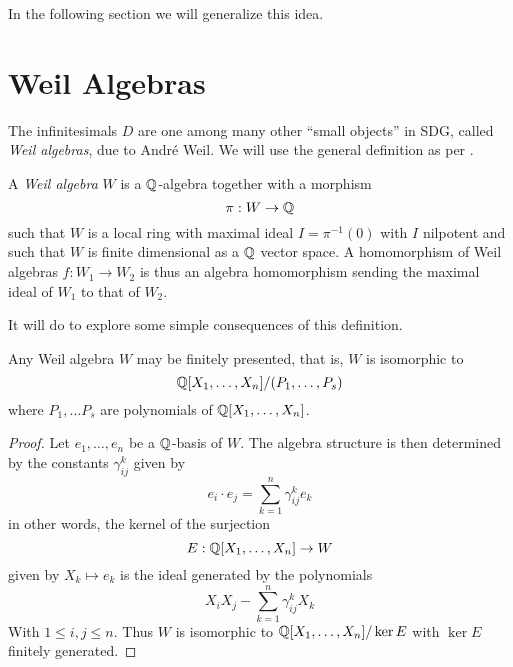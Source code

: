 In the following section we will generalize this idea.

\section{Weil Algebras}

The infinitesimals \( D \) are one among many other ``small objects'' in SDG, called \emph{Weil algebras}, due to André Weil. We will use the general definition as per \cite{bun17}.

\begin{defn}
  A \emph{Weil algebra} \( W \) is a \( \mathbb{Q} \)-algebra together with a morphism
  \begin{equation*}
    \pi: W\to\mathbb{Q}
  \end{equation*}
  such that \( W \) is a local ring with maximal ideal \( I=\pi^{-1}(0) \) with \( I \) nilpotent and such that \( W \) is finite dimensional as a \( \mathbb{Q} \) vector space. A homomorphism of Weil algebras \( f:W_1\to W_2 \) is thus an algebra homomorphism sending the maximal ideal of \( W_1 \) to that of \( W_2 \).
\end{defn}



It will do to explore some simple consequences of this definition.

\begin{lemma}
  Any Weil algebra \( W \) may be finitely presented, that is, \( W \) is isomorphic to
  \begin{equation*}
    \mathbb{Q}[X_1,\dots,X_n]/(P_1,\dots,P_s)
  \end{equation*}
  where \( P_1,\dots P_s \) are polynomials of \( \mathbb{Q}[X_1,\dots,X_n] \).
  \label{lm:finpr}
\end{lemma}

\begin{proof}
  Let \( e_1,\dots,e_n \) be a \( \mathbb{Q} \)-basis of \( W \). The algebra structure is then determined by the constants \( \gamma_{ij}^k \) given by
  \begin{equation*}
    e_i\cdot e_j = \sum_{k=1}^n \gamma_{ij}^ke_k
  \end{equation*}
  in other words, the kernel of the surjection
  \begin{equation*}
    E: \mathbb{Q}[X_1,\dots,X_n]\to W
  \end{equation*}
  given by \( X_k\mapsto e_k \) is the ideal generated by the polynomials
  \begin{equation*}
    X_iX_j - \sum_{k=1}^n\gamma_{ij}^kX_k
  \end{equation*}
  With \( 1\leq i,j\leq n \). Thus \( W \) is isomorphic to \( \mathbb{Q}[X_1,\dots,X_n]/\ker E \) with \( \ker E \) finitely generated.
\end{proof}

